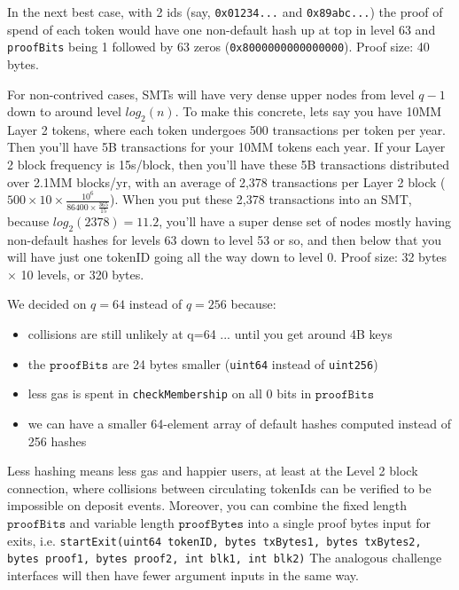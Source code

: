 \documentclass{article}
\newcommand{\proofBits}{\texttt{proofBits}}
\newcommand{\proofBytes}{\texttt{proofBytes}}
\begin{document}
In the next best case, with 2 ids (say, \texttt{0x01234...} and \texttt{0x89abc...}) the proof of spend of each token would have one non-default hash up at top in level 63 and \texttt{proofBits} being 1 followed by 63 zeros (\texttt{0x8000000000000000}). Proof size: 40 bytes.

For non-contrived cases, SMTs will have very dense upper nodes from level $q-1$ down to around level $log_2(n)$. To make this concrete, lets say you have 10MM Layer 2 tokens, where each token undergoes 500 transactions per token per year. Then you'll have 5B transactions for your 10MM tokens each year. If your Layer 2 block frequency is 15s/block, then you'll have these 5B transactions distributed over 2.1MM blocks/yr, with an average of 2,378 transactions per Layer 2 block ($500 \times 10 \times \frac{10^{6}}{86400 \times \frac{365}{15}}$). When you put these 2,378 transactions into an SMT, because $log_2(2378)=11.2$, you'll have a super dense set of nodes mostly having non-default hashes for levels 63 down to level 53 or so, and then below that you will have just one tokenID going all the way down to level 0. Proof size: 32 bytes $\times$ 10 levels, or 320 bytes.

We decided on $q=64$ instead of $q=256$ because: 
\begin{itemize}
\item collisions are still unlikely at q=64 ... until you get around 4B keys
\item the $\proofBits$ are 24 bytes smaller (\texttt{uint64} instead of \texttt{uint256})
\item less gas is spent in \texttt{checkMembership} on all 0 bits in $\proofBits$
\item we can have a smaller 64-element array of default hashes computed instead of 256 hashes
\end{itemize} 
Less hashing means less gas and happier users, at least at the Level 2 block connection, where collisions between circulating tokenIds can be verified to be impossible on deposit events.  Moreover, you can combine the fixed length $\proofBits$ and variable length $\proofBytes$ into a single proof bytes input for exits, i.e. \texttt{startExit(uint64 tokenID, bytes txBytes1, bytes txBytes2, bytes proof1, bytes proof2, int blk1, int blk2)}  The analogous challenge interfaces will then have fewer argument inputs in the same way.
\end{document}
